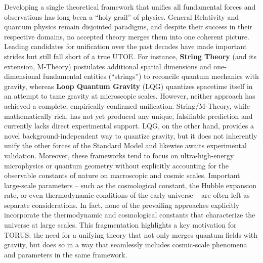 \documentclass[]{article}
\begin{document}
Developing a single theoretical framework that unifies all fundamental
forces and observations has long been a ``holy grail'' of physics.
General Relativity and quantum physics remain disjointed paradigms, and
despite their success in their respective domains, no accepted theory
merges them into one coherent picture. Leading candidates for
unification over the past decades have made important strides but still
fall short of a true UTOE. For instance, \textbf{String Theory} (and its
extension, M-Theory) postulates additional spatial dimensions and
one-dimensional fundamental entities (``strings'') to reconcile quantum
mechanics with gravity, whereas \textbf{Loop Quantum Gravity} (LQG)
quantizes spacetime itself in an attempt to tame gravity at microscopic
scales. However, neither approach has achieved a complete, empirically
confirmed unification. String/M-Theory, while mathematically rich, has
not yet produced any unique, falsifiable prediction and currently lacks
direct experimental support. LQG, on the other hand, provides a novel
background-independent way to quantize gravity, but it does not
inherently unify the other forces of the Standard Model and likewise
awaits experimental validation. Moreover, these frameworks tend to focus
on ultra-high-energy microphysics or quantum geometry without explicitly
accounting for the observable constants of nature on macroscopic and
cosmic scales. Important large-scale parameters -- such as the
cosmological constant, the Hubble expansion rate, or even thermodynamic
conditions of the early universe -- are often left as separate
considerations. In fact, none of the prevailing approaches explicitly
incorporate the thermodynamic and cosmological constants that
characterize the universe at large scales. This fragmentation highlights
a key motivation for TORUS: the need for a unifying theory that not only
merges quantum fields with gravity, but does so in a way that seamlessly
includes cosmic-scale phenomena and parameters in the same framework.
\end{document}
